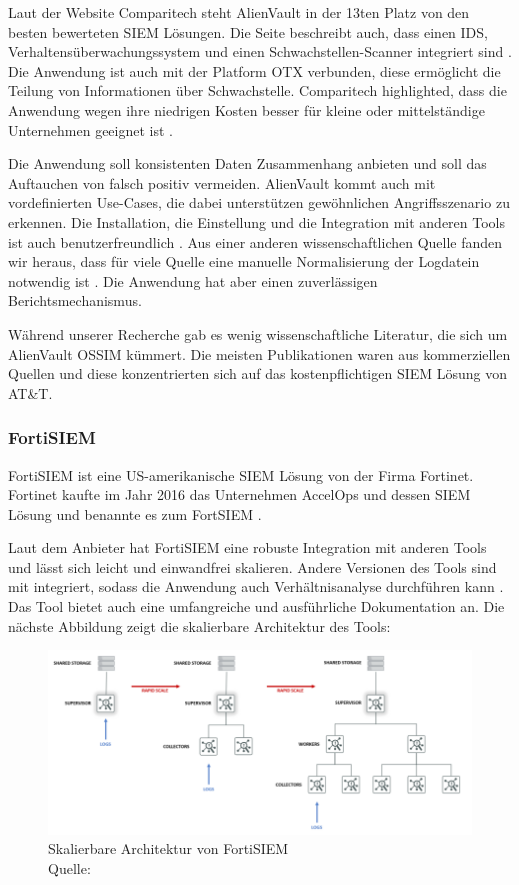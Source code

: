 Laut der Website Comparitech steht AlienVault in der 13ten Platz von den besten bewerteten \gls{SIEM} Lösungen. Die Seite beschreibt auch, dass einen \gls{IDS}, Verhaltensüberwachungssystem und einen Schwachstellen-Scanner integriert sind . Die Anwendung ist auch mit der Platform \gls{OTX} verbunden, diese ermöglicht die Teilung von Informationen über Schwachstelle. Comparitech highlighted, dass die Anwendung wegen ihre niedrigen Kosten besser für kleine oder mittelständige Unternehmen geeignet ist \citep{comparitech_SIEM}. 

Die Anwendung soll konsistenten Daten Zusammenhang anbieten und soll das Auftauchen von \gls{falsch positiv} vermeiden. AlienVault kommt auch mit vordefinierten Use-Cases, die dabei unterstützen gewöhnlichen Angriffsszenario zu erkennen. Die Installation, die Einstellung und die Integration mit anderen Tools ist auch benutzerfreundlich \citep{Gomes_AV}. Aus einer anderen wissenschaftlichen Quelle fanden wir heraus, dass für viele  Quelle eine manuelle Normalisierung der Logdatein notwendig ist \cite{Nabil_AV}. Die Anwendung hat aber einen zuverlässigen Berichtsmechanismus.

Während unserer Recherche gab es wenig wissenschaftliche Literatur, die sich um AlienVault OSSIM kümmert. Die meisten Publikationen waren aus kommerziellen Quellen und diese konzentrierten sich auf das kostenpflichtigen \gls{SIEM} Lösung von AT\&T.

\subsubsection{FortiSIEM}
FortiSIEM ist eine US-amerikanische \gls{SIEM} Lösung von der Firma Fortinet. Fortinet kaufte im Jahr 2016 das Unternehmen AccelOps und dessen \gls{SIEM} Lösung und benannte es zum FortSIEM \citep{Fortinet_Press}. 

Laut dem Anbieter hat FortiSIEM eine robuste Integration mit anderen Tools und lässt sich leicht und einwandfrei skalieren. Andere Versionen des Tools sind mit  integriert, sodass die Anwendung auch Verhältnisanalyse durchführen kann \citep{Fortinet_Solutions}. Das Tool bietet auch eine umfangreiche und ausführliche Dokumentation an. Die nächste Abbildung zeigt die skalierbare Architektur des Tools:

\begin{figure}[H]
   \centering
   \includegraphics[width=1\textwidth]{assets/2_p7.png}
   \caption{Skalierbare Architektur von FortiSIEM \\Quelle: \citep{Fortinet_Arch} }
   \centering
\end{figure}

